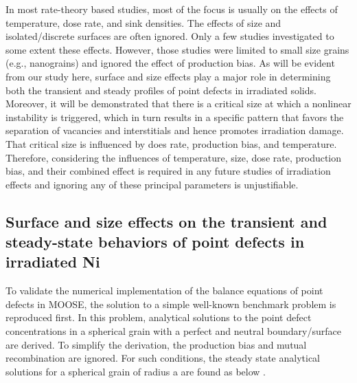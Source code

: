 \documentclass[utf8]{frontiersSCNS} %
\begin{document}
    In most rate-theory based studies, most of the focus is usually on the effects of temperature, dose rate, and sink densities. The effects of size and isolated/discrete surfaces are often ignored. Only a few studies \citep{yang2010,demkowicz2011} investigated to some extent these effects. However, those studies were limited to small size grains (e.g., nanograins) and ignored the effect of production bias. As will be evident from our study here, surface and size effects play a major role in determining both the transient and steady profiles of point defects in irradiated solids. Moreover, it will be demonstrated that there is a critical size at which a nonlinear instability is triggered, which in turn results in a specific pattern that favors the separation of vacancies and interstitials and hence promotes irradiation damage. That critical size is influenced by does rate, production bias, and temperature. Therefore, considering the influences of temperature, size, dose rate, production bias, and their combined effect is required in any future studies of irradiation effects and ignoring any of these principal parameters is unjustifiable.\\

\subsection{Surface and size effects on the transient and steady-state behaviors of point defects in irradiated Ni}

To validate the numerical implementation of the balance equations of point defects in MOOSE, the solution to a simple well-known benchmark problem is reproduced first. In this problem, analytical solutions to the point defect concentrations in a spherical grain with a perfect and neutral boundary/surface are derived. To simplify the derivation, the production bias and mutual recombination are ignored. For such conditions, the steady state analytical solutions for a spherical grain of radius a are found as below \citep{heald1977}.
\end{document}
